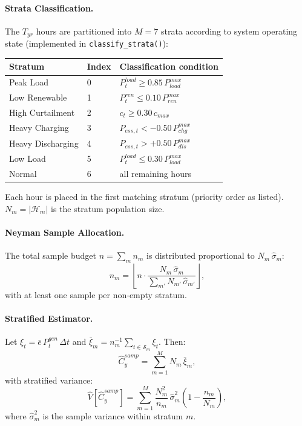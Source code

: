 \paragraph{Strata Classification.}
The $T_{yr}$ hours are partitioned into $M=7$ strata according to system
operating state (implemented in \texttt{classify\_strata()}):

\begin{center}
\begin{tabular}{lll}
\hline\hline
\textbf{Stratum} & \textbf{Index} & \textbf{Classification condition} \\
\hline
Peak Load       & 0 & $P_t^{load} \geq 0.85\,P_{load}^{max}$ \\
Low Renewable   & 1 & $P_t^{ren} \leq 0.10\,P_{ren}^{max}$ \\
High Curtailment & 2 & $c_t \geq 0.30\,c_{max}$ \\
Heavy Charging  & 3 & $P_{ess,t} < -0.50\,P_{chg}^{max}$ \\
Heavy Discharging & 4 & $P_{ess,t} > +0.50\,P_{dis}^{max}$ \\
Low Load        & 5 & $P_t^{load} \leq 0.30\,P_{load}^{max}$ \\
Normal          & 6 & all remaining hours \\
\hline\hline
\end{tabular}
\end{center}

Each hour is placed in the first matching stratum (priority order as listed).
$N_m = |\mathcal{H}_m|$ is the stratum population size.

\paragraph{Neyman Sample Allocation.}
The total sample budget $n = \sum_m n_m$ is distributed proportional to
$N_m\,\hat\sigma_m$:
\begin{equation}
  n_m = \left\lfloor n\cdot
    \frac{N_m\,\hat\sigma_m}{\sum_{m'} N_{m'}\,\hat\sigma_{m'}}
  \right\rfloor,
\end{equation}
with at least one sample per non-empty stratum.

\paragraph{Stratified Estimator.}
Let $\xi_t = \bar{e}\,P_t^{gen}\,\Delta t$ and
$\bar\xi_m = n_m^{-1}\sum_{t\in\mathcal{S}_m}\xi_t$.  Then:
\begin{equation}
  \hat{C}_y^{samp} = \sum_{m=1}^M N_m\,\bar\xi_m,
  \label{eq:tier2}
\end{equation}
with stratified variance:
\begin{equation}
  \hat{V}\!\left[\hat{C}_y^{samp}\right]
  = \sum_{m=1}^M \frac{N_m^2}{n_m}\,\hat\sigma_m^2
    \!\left(1 - \frac{n_m}{N_m}\right),
  \label{eq:strat-var}
\end{equation}
where $\hat\sigma_m^2$ is the sample variance within stratum $m$.

